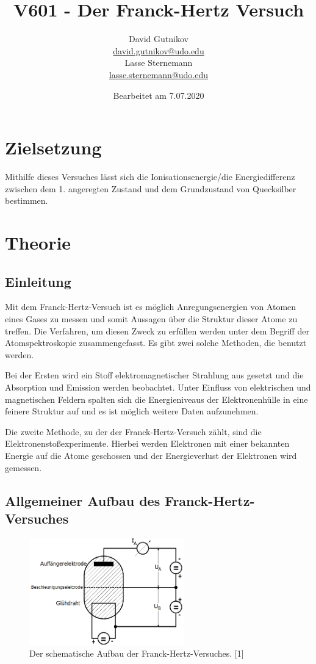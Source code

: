 \documentclass[titlepage = firstcover]{scrartcl}
\title{V601 - Der Franck-Hertz Versuch}
\author{
  David Gutnikov\\
  \href{mailto:david.gutnikov@udo.edu}{david.gutnikov@udo.edu}\\
  Lasse Sternemann\\
  \href{mailto:lasse.sternemann@udo.edu}{lasse.sternemann@udo.edu}
}
\date{Bearbeitet am 7.07.2020}
\begin{document}
    \maketitle
    \newpage
    \tableofcontents
    \newpage

    \section{Zielsetzung}
        Mithilfe dieses Versuches lässt sich die Ionisationsenergie/die Energiedifferenz zwischen dem 1. angeregten Zustand und dem Grundzustand von Quecksilber bestimmen.

    \section{Theorie}
        \subsection{Einleitung}
            Mit dem Franck-Hertz-Versuch ist es möglich Anregungsenergien von Atomen eines Gases zu messen und somit Aussagen über die Struktur dieser Atome zu treffen.
            Die Verfahren, um diesen Zweck zu erfüllen werden unter dem Begriff der Atomspektroskopie zusammengefasst.
            Es gibt zwei solche Methoden, die benutzt werden.

            Bei der Ersten wird ein Stoff elektromagnetischer Strahlung aus gesetzt und die Absorption und Emission werden beobachtet. Unter Einfluss von elektrischen und magnetischen Feldern spalten sich die Energieniveaus der Elektronenhülle in eine feinere Struktur auf und es ist möglich weitere Daten aufzunehmen.

            Die zweite Methode, zu der der Franck-Hertz-Versuch zählt, sind die Elektronenstoßexperimente. Hierbei werden Elektronen mit einer bekannten Energie auf die Atome geschossen und der Energieverlust der Elektronen wird gemessen.

        \subsection{Allgemeiner Aufbau des Franck-Hertz-Versuches}
            \begin{figure}[h]
                \centering
                \includegraphics[width = 0.6\textwidth]{Bilder/Aufbau_FranckHertz.png}
                \caption{Der schematische Aufbau der Franck-Hertz-Versuches. [1]}
                \label{fig:Aufbau_FranckHertz}
            \end{figure}
\end{document}
